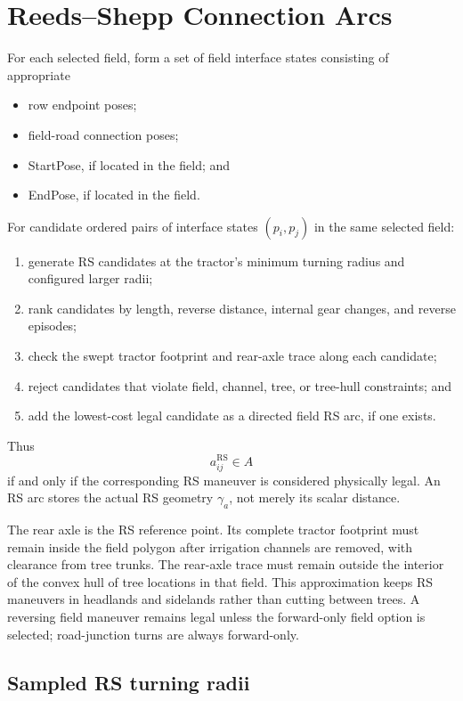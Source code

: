 \documentclass{article}
\begin{document}
\section{Reeds--Shepp Connection Arcs}

For each selected field, form a set of field interface states consisting of appropriate
\begin{itemize}
\item row endpoint poses;
\item field-road connection poses;
\item StartPose, if located in the field; and
\item EndPose, if located in the field.
\end{itemize}
For candidate ordered pairs of interface states $(p_i,p_j)$ in the same selected field:
\begin{enumerate}
\item generate RS candidates at the tractor's minimum turning radius and configured larger radii;
\item rank candidates by length, reverse distance, internal gear changes, and reverse episodes;
\item check the swept tractor footprint and rear-axle trace along each candidate;
\item reject candidates that violate field, channel, tree, or tree-hull constraints; and
\item add the lowest-cost legal candidate as a directed field RS arc, if one exists.
\end{enumerate}

Thus
$$
a_{ij}^{\mathrm{RS}}\in A
$$
if and only if the corresponding RS maneuver is considered physically legal.
An RS arc stores the actual RS geometry $\gamma_a$, not merely its scalar distance.

The rear axle is the RS reference point. Its complete tractor footprint must remain inside the field polygon after irrigation channels are removed, with clearance from tree trunks. The rear-axle trace must remain outside the interior of the convex hull of tree locations in that field. This approximation keeps RS maneuvers in headlands and sidelands rather than cutting between trees. A reversing field maneuver remains legal unless the forward-only field option is selected; road-junction turns are always forward-only.

\subsection{Sampled RS turning radii}
\end{document}
